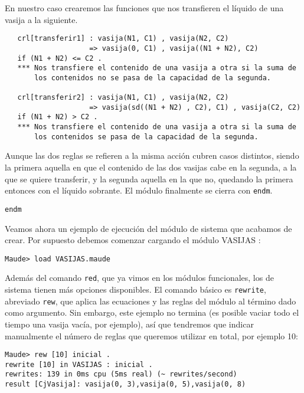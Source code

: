 En nuestro caso crearemos las funciones que nos transfieren el líquido de una vasija a la siguiente.\par 
{\codesize
\begin{verbatim}
   crl[transferir1] : vasija(N1, C1) , vasija(N2, C2) 
                    => vasija(0, C1) , vasija((N1 + N2), C2) 
   if (N1 + N2) <= C2 .
   *** Nos transfiere el contenido de una vasija a otra si la suma de 
       los contenidos no se pasa de la capacidad de la segunda.

   crl[transferir2] : vasija(N1, C1) , vasija(N2, C2) 
                    => vasija(sd((N1 + N2) , C2), C1) , vasija(C2, C2)
   if (N1 + N2) > C2 .
   *** Nos transfiere el contenido de una vasija a otra si la suma de 
       los contenidos se pasa de la capacidad de la segunda.
\end{verbatim}
}
Aunque las dos reglas se refieren a la misma acción cubren casos distintos, siendo la primera aquella en que el contenido de las dos vasijas cabe en la segunda, a la que se quiere transferir, y la segunda aquella en la que no, quedando la primera entonces con el líquido sobrante. El módulo finalmente se cierra con \texttt{endm}.
{\codesize
\begin{verbatim}
endm
\end{verbatim}
}


Veamos ahora un ejemplo de ejecución del módulo de sistema que acabamos de crear. Por supuesto debemos comenzar cargando el módulo VASIJAS :\par

{\codesize
\begin{verbatim}
Maude> load VASIJAS.maude
\end{verbatim}
}

Además del comando \texttt{red}, que ya vimos en los módulos funcionales, los de sistema tienen más opciones disponibles. El comando básico es \texttt{rewrite}, abreviado \texttt{rew}, que aplica las ecuaciones y las reglas del módulo al término dado como argumento. Sin embargo, este ejemplo no termina (es posible vaciar todo el tiempo
una vasija vacía, por ejemplo), así que tendremos que indicar manualmente el número de reglas que queremos utilizar en total, por ejemplo 10:

{\codesize
\begin{verbatim}
Maude> rew [10] inicial .
rewrite [10] in VASIJAS : inicial .
rewrites: 139 in 0ms cpu (5ms real) (~ rewrites/second)
result [CjVasija]: vasija(0, 3),vasija(0, 5),vasija(0, 8)
\end{verbatim}
}

